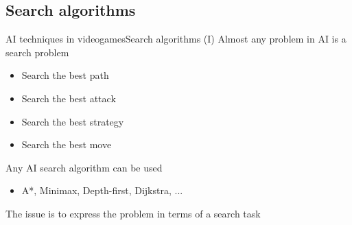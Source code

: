 \documentclass[10pt,compress]{beamer} %
\begin{document}
\subsection{Search algorithms}
\begin{frame}{AI techniques in videogames}{Search algorithms (I)}
	Almost any problem in AI is a search problem
		\begin{itemize}
		\item Search the best path
		\item Search the best attack
		\item Search the best strategy
		\item Search the best move
		\end{itemize}
	Any AI search algorithm can be used
		\begin{itemize}
		\item A*, Minimax, Depth-first, Dijkstra, ... 
		\end{itemize}
	The issue is to express the problem in terms of a search task
\end{frame}
\end{document}
